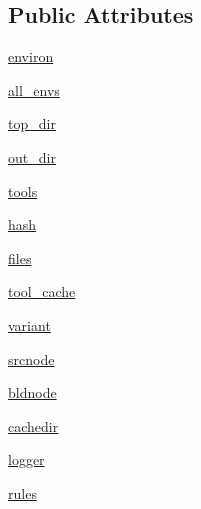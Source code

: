 \subsection*{Public Attributes}
\begin{DoxyCompactItemize}
\item 
\hyperlink{classwaflib_1_1_configure_1_1_configuration_context_a77e99f9b360ecb22608ded3b51418394}{environ}
\item 
\hyperlink{classwaflib_1_1_configure_1_1_configuration_context_a2a854b43099bb450e2ddf76d7bbedc1b}{all\+\_\+envs}
\item 
\hyperlink{classwaflib_1_1_configure_1_1_configuration_context_af5c1b0904233001f71a0016c1c15077a}{top\+\_\+dir}
\item 
\hyperlink{classwaflib_1_1_configure_1_1_configuration_context_acbaeb376eb6c92d21f4060b5225a951b}{out\+\_\+dir}
\item 
\hyperlink{classwaflib_1_1_configure_1_1_configuration_context_a165ec268f036496bdaf3c00d59dcdef6}{tools}
\item 
\hyperlink{classwaflib_1_1_configure_1_1_configuration_context_a45c2f2e7ddb2faef9587d460b90c1689}{hash}
\item 
\hyperlink{classwaflib_1_1_configure_1_1_configuration_context_ae982f3ec2796181cda27d70b375be394}{files}
\item 
\hyperlink{classwaflib_1_1_configure_1_1_configuration_context_a2445499831b4b91b53105cabe67c94af}{tool\+\_\+cache}
\item 
\hyperlink{classwaflib_1_1_configure_1_1_configuration_context_a8a4f042ddd96013a3179867ce0d61a04}{variant}
\item 
\hyperlink{classwaflib_1_1_configure_1_1_configuration_context_ad932bc43b1f9d811a01a4c184c43c6fc}{srcnode}
\item 
\hyperlink{classwaflib_1_1_configure_1_1_configuration_context_a66b0f6841a7a4c72c987db9ea1ba1b28}{bldnode}
\item 
\hyperlink{classwaflib_1_1_configure_1_1_configuration_context_a23b9593fb2789a28e6a10a86bcf4f56e}{cachedir}
\item 
\hyperlink{classwaflib_1_1_configure_1_1_configuration_context_afe93350b0387037ae0c5cb9dcd3043a2}{logger}
\item 
\hyperlink{classwaflib_1_1_configure_1_1_configuration_context_a279ad5a7c2630c4416afc36cad85a2db}{rules}
\end{DoxyCompactItemize}
